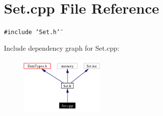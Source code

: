 \section{Set.cpp File Reference}
\label{Set_8cpp}
{\tt \#include \char`\"{}Set.h\char`\"{}}\par


Include dependency graph for Set.cpp:\begin{figure}[H]
\begin{center}
\leavevmode
\includegraphics[width=117pt]{Set_8cpp__incl}
\end{center}
\end{figure}

